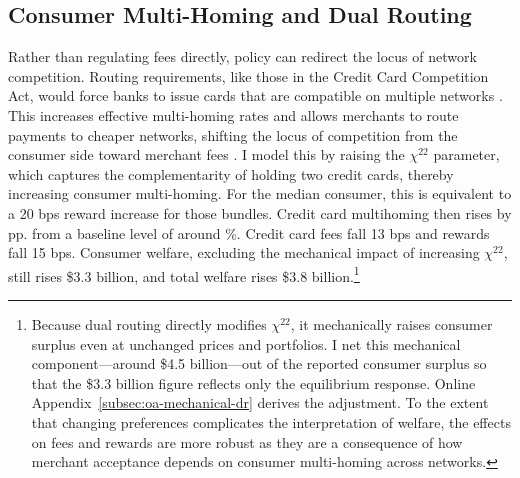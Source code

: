 \documentclass[main.tex]{subfiles}
\begin{document}
\subsection{Consumer Multi-Homing and Dual Routing}
\label{subsec:dual-routing}

Rather than regulating fees directly, policy can redirect the locus of network competition.
Routing requirements, like those in the Credit Card Competition Act, would force banks to issue cards that are compatible on multiple networks \parencite{Andriotis2022}.
This increases effective multi-homing rates and allows merchants to route payments to cheaper networks, shifting the locus of competition from the consumer side toward merchant fees \parencite{Teh.etal2022}.
I model this by raising the $\chi^{22}$ parameter, which captures the complementarity of holding two credit cards, thereby increasing consumer multi-homing.
For the median consumer, this is equivalent to a 20 bps reward increase for those bundles.
Credit card multihoming then rises by  pp. from a baseline level of around \%.
Credit card fees fall 13 bps
and rewards fall 15 bps.
Consumer welfare, excluding the mechanical impact of increasing $\chi^{22}$, still rises \$3.3 billion, and total welfare rises \$3.8 billion.\footnote{
Because dual routing directly modifies $\chi^{22}$, it mechanically raises consumer surplus even at unchanged prices and portfolios. I net this mechanical component---around \$4.5 billion---out of the reported consumer surplus so that the \$3.3 billion figure reflects only the equilibrium response. Online Appendix~\ref{subsec:oa-mechanical-dr} derives the adjustment.
To the extent that changing preferences complicates the interpretation of welfare, the effects on fees and rewards are more robust as they are a consequence of how merchant acceptance depends on consumer multi-homing across networks.}
\end{document}
